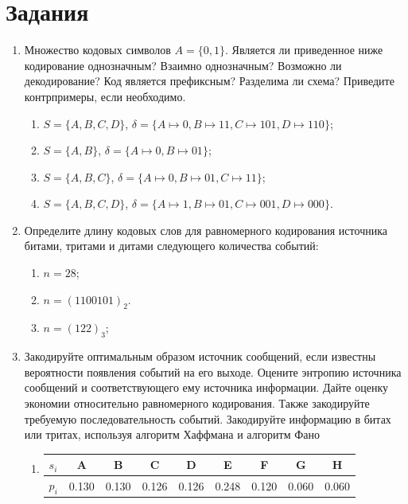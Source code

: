\section*{Задания}

\begin{enumerate}

    \item Множество кодовых символов $A=\{0,1\}$. Является ли приведенное ниже кодирование однозначным? Взаимно однозначным? Возможно ли декодирование? Код является префиксным? Разделима ли схема? Приведите контрпримеры, если необходимо.
    \begin{enumerate}
        \item $S=\{A,B,C,D\}$, $\delta=\{ A\mapsto 0,B\mapsto 11,C\mapsto 101, D\mapsto 110\}$;
        \item $S=\{A,B\}$, $\delta=\{ A\mapsto 0,B\mapsto 01\}$;
        \item $S=\{A,B,C\}$, $\delta=\{ A\mapsto 0,B\mapsto 01,C\mapsto 11\}$;
        \item $S=\{A,B,C,D\}$, $\delta=\{ A\mapsto 1,B\mapsto 01,C\mapsto 001,D\mapsto 000\}$.
    \end{enumerate}
    
    \item Определите длину кодовых слов для равномерного кодирования источника битами, тритами и дитами следующего количества событий:
    \begin{enumerate}
        \item $n=28$;
        \item $n=(1100101)_2$.
        \item $n=(122)_3$;
    \end{enumerate}
    
    \item Закодируйте оптимальным образом источник сообщений, если известны вероятности появления событий на его выходе. Оцените энтропию источника сообщений и соответствующего ему источника информации. Дайте оценку экономии относительно равномерного кодирования. Также закодируйте требуемую последовательность событий. Закодируйте информацию в битах или тритах, используя алгоритм Хаффмана и алгоритм Фано
    
    \begin{enumerate}
        \item 
            \begin{tabular}{|l||c|c|c|c|c|c|c|c|}
                \hline
                $s_i$   &A      &B      &C      &D      &E      &F      &G      &H      \\ \hline
                $p_i$   &0.130  &0.130  &0.126  &0.126  &0.248  &0.120  &0.060  &0.060  \\ \hline
            \end{tabular}
            

\end{enumerate}
\end{enumerate}
